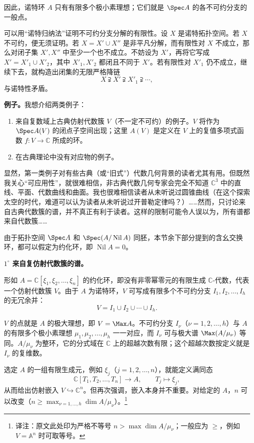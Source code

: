 因此，诺特环 $A$ 只有有限多个极小素理想；它们就是 $\Spec A$ 的各不可约分支的一般点。

可以用“诺特归纳法”证明不可约分支分解的有限性。设 $X$ 是诺特拓扑空间。若 $X$ 不可约，便无须证明。若 $X=X'\cup X''$ 是非平凡分解，而有限性对 $X$ 不成立，那么对闭子集 $X',X''$ 中至少一个也不成立。不妨设为 $X'$，再将它写成 $X'=X'_1\cup X'_2$，其中 $X'_1,X'_2$ 都闭且不同于 $X'$。若有限性对 $X'_1$ 仍不成立，继续下去，就构造出闭集的无限严格降链
\[
X\supsetneqq X'\supsetneqq X'_1\supsetneqq\cdots,
\]
与诺特性矛盾。

\textbf{例子。}我想介绍两类例子：
\begin{enumerate}[label=\arabic*$^\circ$]
\item 来自复数域上古典仿射代数簇 $V$（不一定不可约）的例子。$V$ 将作为 $\Spec A(V)$ 的闭点子空间出现；这里 $A(V)$ 是定义在 $V$ 上的复值多项式函数 $f:V\to\mathbb C$ 所成的环。
\item 在古典理论中没有对应物的例子。
\end{enumerate}
显然，第一类例子对有些古典（或“旧式”）代数几何背景的读者尤其有用。但既然我关心“可应用性”，就很难相信，非古典代数几何专家会完全不知道 $\mathbb C^3$ 中的直线、平面、代数曲线和曲面。我也很难相信读者从未听说过圆锥曲线（在这个探索太空的时代，难道可以认为读者从未听说过开普勒定律吗？）……然而，只讨论来自古典代数簇的谱，并不真正有利于读者。这样的限制可能令人误以为，所有谱都来自代数簇……

由于拓扑空间 $\Spec A$ 和 $\Spec(A/\operatorname{Nil}A)$ 同胚，本节余下部分提到的含幺交换环，都可以假定为约化环，即 $\operatorname{Nil}A=0$。

\textbf{$1^\circ$ 来自复仿射代数簇的谱。}

形如 $A=\mathbb C[\xi_1,\xi_2,\ldots,\xi_n]$ 的约化环，即没有非零幂零元的有限生成 $\mathbb C$-代数，代表一个仿射代数簇 $V$。由于 $A$ 为诺特环，$V$ 可写成有限多个不可约分支 $I_1,I_2,\ldots,I_h$ 的无冗余并：
\[
V=I_1\cup I_2\cup\cdots\cup I_h.
\]

$V$ 的点就是 $A$ 的极大理想，即 $V=\Max A$。不可约分支 $I_\nu$（$\nu=1,2,\ldots,h$）与 $A$ 的有限多个极小素理想 $\mu_1,\mu_2,\ldots,\mu_h$ 一一对应，而 $I_\nu$ 可与极大谱 $\Max(A/\mu_\nu)$ 等同。$A/\mu_\nu$ 为整环，它的分式域在 $\mathbb C$ 上的超越次数有限；这个超越次数按定义就是 $I_\nu$ 的复维数。

选定 $A$ 的一组有限生成元，例如 $\xi_j$（$j=1,2,\ldots,n$），就能定义满同态
\[
\mathbb C[T_1,T_2,\ldots,T_n]\longrightarrow A,
\qquad T_j\longmapsto\xi_j,
\]
从而给出仿射嵌入 $V\hookrightarrow\mathbb C^n$。但再次强调，嵌入本身并不重要。对给定的 $A$，$n$ 可以改变（$n\geq\max_{\nu=1,\ldots,h}\dim A/\mu_\nu$）。\footnote{译注：原文此处印为严格不等号 $n>\max\dim A/\mu_\nu$；一般应为 $\geq$，例如 $V=\mathbb A^n$ 时可取等号。}

